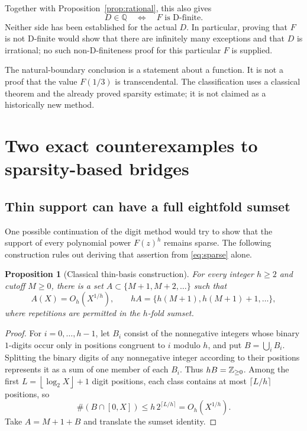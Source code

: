 \documentclass[11pt,a4paper]{article}
\newtheorem{proposition}[theorem]{Proposition}
\theoremstyle{definition}
\theoremstyle{remark}\newtheorem{remark}[theorem]{Remark}
\newcommand{\Q}{\mathbb Q}\newcommand{\C}{\mathbb C}
\newcommand{\floor}[1]{\left\lfloor #1\right\rfloor}
\begin{document}
Together with Proposition~\ref{prop:rational}, this also gives
\[
 D\in\Q\quad\Longleftrightarrow\quad F\text{ is D-finite}.
\]
Neither side has been established for the actual $D$. In particular,
proving that $F$ is not D-finite would show that there are infinitely
many exceptions and that $D$ is irrational; no such non-D-finiteness
proof for this particular $F$ is supplied.

The natural-boundary conclusion is a statement about a function.
It is not a proof that the value $F(1/3)$ is transcendental. The
classification uses a classical theorem and the already proved
sparsity estimate; it is not claimed as a historically new method.

\section{Two exact counterexamples to sparsity-based bridges}
\label{sec:sparsebridges}

\subsection{Thin support can have a full eightfold sumset}

One possible continuation of the digit method would try to show that
the support of every polynomial power $F(z)^h$ remains sparse.
The following construction rules out deriving that assertion from
\eqref{eq:sparse} alone.

\begin{proposition}[Classical thin-basis construction]\label{prop:thin}
For every integer $h\ge2$ and cutoff $M\ge0$, there is a set
$A\subset\{M+1,M+2,\ldots\}$ such that
\[
 A(X)=O_h(X^{1/h}),\qquad
 hA=\{h(M+1),h(M+1)+1,\ldots\},
\]
where repetitions are permitted in the $h$-fold sumset.
\end{proposition}
\begin{proof}
For $i=0,\ldots,h-1$, let $B_i$ consist of the nonnegative integers
whose binary $1$-digits occur only in positions congruent to $i$
modulo $h$, and put $B=\bigcup_i B_i$. Splitting the binary digits
of any nonnegative integer according to their positions represents
it as a sum of one member of each $B_i$. Thus $hB=\mathbb Z_{\ge0}$.
Among the first $L=\floor{\log_2X}+1$ digit positions, each class
contains at most $\lceil L/h\rceil$ positions, so
\[
 \#(B\cap[0,X])\le h\,2^{\lceil L/h\rceil}=O_h(X^{1/h}).
\]
Take $A=M+1+B$ and translate the sumset identity.
\end{proof}
\end{document}
